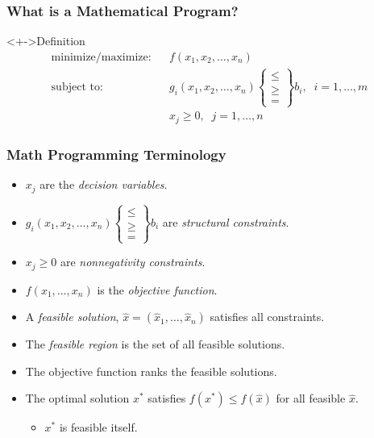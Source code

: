 \documentclass[12pt,handout]{beamer}
\begin{document}
\begin{frame}
\frametitle{What is a Mathematical Program?}
\begin{block}<+->{Definition}
\begin{eqnarray}
\mbox{minimize/maximize:} && f(x_1, x_2, \ldots, x_n) \nonumber \\
\mbox{subject to:} && g_i(x_1, x_2, \ldots, x_n)
\begin{Bmatrix}   \le \\
                   \ge \\
                   =
\end{Bmatrix}
b_i, \;\; i = 1, \ldots, m \nonumber \\
&& x_j \ge 0,\;\;j = 1, \ldots, n \nonumber
\end{eqnarray}
\end{block}
\end{frame}

\begin{frame}
\frametitle{Math Programming Terminology}
\begin{itemize}
\item $x_j$ are the {\em decision variables}.
\item $g_i(x_1, x_2, \ldots, x_n) \begin{Bmatrix}   \le \\
                    \ge \\
                    =
\end{Bmatrix} b_i$ are {\em structural constraints}.
\item $x_j \ge 0$ are {\em nonnegativity constraints}.
\item $f(x_1, \ldots, x_n)$ is the {\em objective function}.
\item A {\em feasible solution}, $\hat{x} = (\hat{x}_1, \ldots, \hat{x}_n)$ satisfies all constraints.
\item The {\em feasible region} is the set of all feasible solutions.
\item The objective function ranks the feasible solutions.
\item The optimal solution $x^*$ satisfies $f(x^*) \le f(\hat{x})$ for all feasible $\hat{x}$.
\begin{itemize}
\item $x^*$ is feasible itself.
\end{itemize}
\end{itemize}
\end{frame}
\end{document}
